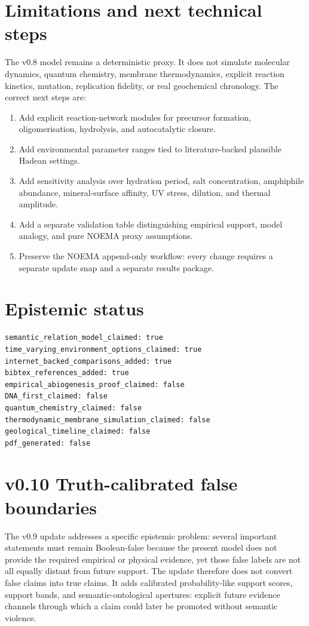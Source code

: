 \documentclass[11pt]{article}
\begin{document}
\section{Limitations and next technical steps}
The v0.8 model remains a deterministic proxy. It does not simulate molecular dynamics, quantum chemistry, membrane thermodynamics, explicit reaction kinetics, mutation, replication fidelity, or real geochemical chronology. The correct next steps are:
\begin{enumerate}[leftmargin=*]
  \item Add explicit reaction-network modules for precursor formation, oligomerisation, hydrolysis, and autocatalytic closure.
  \item Add environmental parameter ranges tied to literature-backed plausible Hadean settings.
  \item Add sensitivity analysis over hydration period, salt concentration, amphiphile abundance, mineral-surface affinity, UV stress, dilution, and thermal amplitude.
  \item Add a separate validation table distinguishing empirical support, model analogy, and pure NOEMA proxy assumptions.
  \item Preserve the NOEMA append-only workflow: every change requires a separate update snap and a separate results package.
\end{enumerate}

\section{Epistemic status}
\begin{verbatim}
semantic_relation_model_claimed: true
time_varying_environment_options_claimed: true
internet_backed_comparisons_added: true
bibtex_references_added: true
empirical_abiogenesis_proof_claimed: false
DNA_first_claimed: false
quantum_chemistry_claimed: false
thermodynamic_membrane_simulation_claimed: false
geological_timeline_claimed: false
pdf_generated: false
\end{verbatim}


\section{v0.10 Truth-calibrated false boundaries}
The v0.9 update addresses a specific epistemic problem: several important statements must remain Boolean-false because the present model does not provide the required empirical or physical evidence, yet those false labels are not all equally distant from future support.  The update therefore does not convert false claims into true claims.  It adds calibrated probability-like support scores, support bands, and semantic-ontological apertures: explicit future evidence channels through which a claim could later be promoted without semantic violence.
\end{document}
